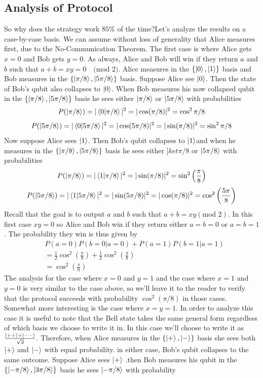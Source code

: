\subsection*{Analysis of Protocol}
So why does the strategy work $85\%$ of the time?Let's analyze the results on a case-by-case basis. We can assume without loss of generality that Alice measures first, due to the No-Communication Theorem. The first case is where Alice gets $x=0$ and Bob gets $y=0$. As always, Alice and Bob will win if they return $a$ and $b$ such that $a+b=xy=0\quad \text{(mod 2)}$. Alice measures in the $\{\ket{0},\ket{1}\}$ basis and Bob measures in the $\{\ket{\pi/8},\ket{5\pi/8}\}$ basis. Suppose Alice see $\ket{0}$. Then the state of Bob's qubit also collapses to $\ket{0}$. When Bob measures his now collapsed qubit in the $\{\ket{\pi/8},\ket{5\pi/8}\}$ basis he sees either $\ket{\pi/8}$ or $\ket{5\pi/8}$ with probabilities
\[
P(\ket{\pi/8})=|\braket{0|\pi/8}|^2=|\cos(\pi/8)|^2=\cos^2\pi/8
\]
\[
P(\ket{5\pi/8})=|\braket{0|5\pi/8}|^2=|\cos(5\pi/8)|^2=|\sin(\pi/8)|^2=\sin^2\pi/8
\]
Now suppose Alice sees $\ket{1}$. Then Bob's qubit collapses to $\ket{1}$and when he measures in the $\{\ket{\pi/8},\ket{5\pi/8}\}$ basis he sees either $]ket{\pi/8}$ or $\ket{5\pi/8}$ with probabilities
\[
P(\ket{\pi/8})=|\braket{1|\pi/8}|^2=|\sin(\pi/8)|^2=\sin^2\left(\frac{\pi}{8}\right)
\]
\[
P(\ket{5\pi/8})=|\braket{1|5\pi/8}|^2=|\sin(5\pi/8)|^2=|\cos(\pi/8)|^2=\cos^2\left(\frac{5\pi}{8}\right)
\]
Recall that the goal is to output $a$ and $b$ such that $a+b=xy(\text{mod 2})$. In this first case $xy=0$ so Alice and Bob win if they return either $a=b=0$ or $a=b=1$. The probability they win is thus given by
\begin{align*}
&P(a=0)P(b=0|a=0)+P(a=1)P(b=1|a=1)\\
&=\frac{1}{2}\cos^2\left(\frac{\pi}{8}\right)+\frac{1}{2}\cos^2\left(\frac{\pi}{8}\right)\\
&=\cos^2\left(\frac{\pi}{8}\right)
\end{align*}
The analysis for the case where $x=0$ and $y=1$ and the case where $x=1$ and $y=0$ is very similar to the case above, so we'll leave it to the reader to verify that the protocol succeeds with probability $\cos^2(\pi/8)$ in those cases. Somewhat more interesting is the case where $x=y=1$. In order to analyze this case it is useful to note that the Bell state takes the same general form regardless of which basis we choose to write it in. In this case we'll choose to write it as $\frac{\ket{++}+\ket{--}}{\sqrt{2}}$. Therefore, when Alice measures in the $\{\ket{+},\ket{-}\}$ basis she sees both $\ket{+}$ and $\ket{-}$ with equal probability. in either case, Bob's qubit collapses to the same outcome. Suppose Alice sees $\ket{+}$ .then Bob measures his qubit in the $\{\ket{-\pi/8},\ket{3\pi/8}\}$ basis he sees $\ket{-\pi/8}$ with probability
